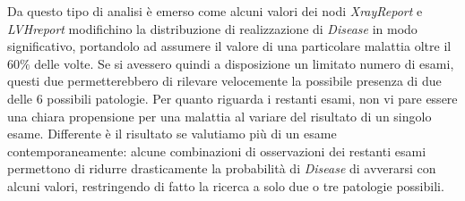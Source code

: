 Da questo tipo di analisi è emerso come alcuni valori dei nodi \textit{XrayReport} e \textit{LVHreport} modifichino la distribuzione di realizzazione di \textit{Disease} in modo significativo, portandolo ad assumere il valore di una particolare malattia oltre il $60\%$ delle volte. Se si avessero quindi a disposizione un limitato numero di esami, questi due permetterebbero di rilevare velocemente la possibile presenza di due delle 6 possibili patologie. Per quanto riguarda i restanti esami, non vi pare essere una chiara propensione per una malattia al variare del risultato di un singolo esame. Differente è il risultato se valutiamo più di un esame contemporaneamente: alcune combinazioni di osservazioni dei restanti esami permettono di ridurre drasticamente la probabilità di \textit{Disease} di avverarsi con alcuni valori, restringendo di fatto la ricerca a solo due o tre patologie possibili. 